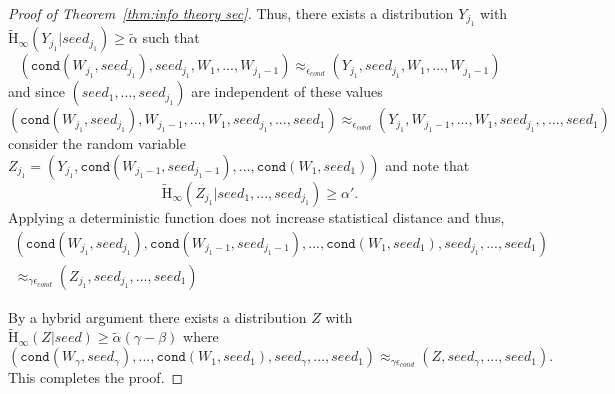 \documentclass[11pt]{article}
\newcommand{\class}[1]{{\ensuremath{\mathsf{#1}}}}
\newcommand{\sketch}{\ensuremath{\class{SS}}\xspace}
\newcommand{\rec}{\ensuremath{\class{Rec}}\xspace}
\newcommand{\Hoo}{\mathrm{H}_\infty}
\newcommand{\Hav}{\tilde{\mathrm{H}}_\infty}
\newcommand{\ext}{\ensuremath{\mathtt{ext}}}
\newcommand{\cond}{\ensuremath{\mathtt{cond}}}
\begin{document}
\begin{proof}[Proof of Theorem~\ref{thm:info theory sec}]
\noindent
Thus, there exists a distribution $Y_{j_1}$ with $\Hav(Y_{j_1} | seed_{j_1}) \ge \tilde{\alpha}$ such that
\[(\cond (W_{j_1}, seed_{j_1}), seed_{j_1}, W_1,..., W_{j_1-1}) \approx_{\epsilon_{cond}} (Y_{j_1}, seed_{j_1}, W_1,..., W_{j_1-1})\]
and since $(seed_1,..., seed_{j_1})$ are independent of these values
\[(\cond (W_{j_1},seed_{j_1}), W_{j_1-1},..., W_1, seed_{j_1}, ..., seed_{1}) \approx_{\epsilon_{cond}} (Y_{j_1}, W_{j_1-1},..., W_1, seed_{j_1}, , ...,  seed_{1})\]
consider the random variable $Z_{j_1} =( Y_{j_1}, \cond(W_{j_1-1},seed_{j_1-1}),..., \cond(W_{1}, seed_{1}))$ and note that \[\Hav(Z_{j_1} | seed_1,...,seed_{j_1})\ge \alpha'.\]
Applying a deterministic function does not increase statistical distance and thus,
\begin{align*}
(\cond (W_{j_1}, seed_{j_1}), \cond(W_{j_1-1}, seed_{j_1-1}),..., \cond(W_1, seed_1), seed_{j_1},..., seed_{1}) \\\approx_{\gamma \epsilon_{cond}} (Z_{j_1}, seed_{j_1},..., seed_1)
\end{align*}

\noindent
By a hybrid argument there exists a distribution $Z$ with $\Hav(Z | seed) \ge \tilde{\alpha}(\gamma -\beta)$ where
\[
(\cond(W_\gamma, seed_\gamma), ..., \cond(W_1, seed_1), seed_\gamma,..., seed_1) \approx_{\gamma \epsilon_{cond}} (Z, seed_\gamma,...,  seed_1).\]
This completes the proof.
\end{proof}
\end{document}
